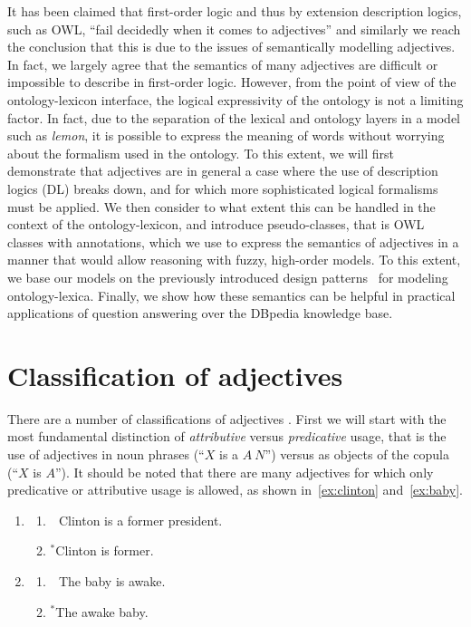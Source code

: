 \documentclass[11pt]{article}
\begin{document}
It has been claimed that first-order logic and thus by extension description 
logics, such as OWL, ``fail decidedly when it comes to adjectives''
\cite{bankston2003modeling} and similarly we reach the conclusion that 
this is due to the issues of semantically modelling adjectives. In fact, we largely agree that the semantics 
of many adjectives are difficult or impossible to describe in first-order logic. 
However, from the point of view of the ontology-lexicon interface, the logical 
expressivity of the ontology is not a limiting factor. In fact, due to the 
separation of the lexical and ontology layers in a model such as \emph{lemon}, 
it is possible to express the meaning of words without worrying about the 
formalism used in the ontology. To this extent, we will first demonstrate that 
adjectives are in general a case where the use of description logics (DL) breaks down, 
and for which more sophisticated logical formalisms must be applied. We then 
consider to what extent this can be handled in the context of the 
ontology-lexicon, and introduce pseudo-classes, that is OWL classes with 
annotations, which we use to express the semantics of adjectives in a manner
that would allow reasoning with fuzzy, high-order models. To this extent, we base
our models on the previously introduced design patterns~\cite{mccrae2014design}
for modeling ontology-lexica. 
Finally, we show how these semantics can be helpful in practical applications 
of question answering over the DBpedia knowledge base.

\section{Classification of adjectives}

There are a number of classifications of adjectives \cite{}. First we will start 
with the most fundamental distinction of \emph{attributive} versus 
\emph{predicative} usage, that is the use of adjectives in noun phrases 
(``$X$ is a $A~N$'') versus as objects of the copula (``$X$ is $A$''). 
It should be noted that there are many adjectives for which only predicative or 
attributive usage is allowed, as shown in~\ref{ex:clinton} and~\ref{ex:baby}.

\begin{enumerate}[resume]
\item \begin{enumerate}	
\item \ \,Clinton is a former president.
\item $^*$Clinton is former.
\end{enumerate}
\label{ex:clinton}
\item \begin{enumerate}	
\item \ \,The baby is awake.
\item $^*$The awake baby.
\end{enumerate}
\label{ex:baby}
\end{enumerate}
\end{document}
